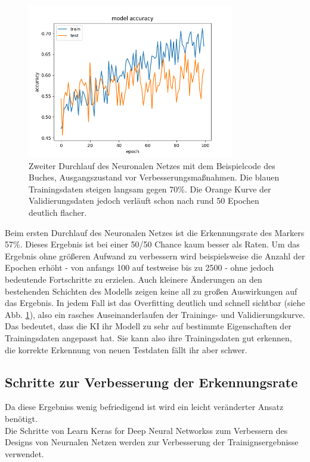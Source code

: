 \documentclass[conference]{IEEEtran}
\begin{document}
\begin{figure}[!h]
	\centering
	\includegraphics[width=9cm]{img/160x120:100@32_accuracy.png}
	\caption{Zweiter Durchlauf des Neuronalen Netzes mit dem Beispielcode
		des Buches, Ausgangszustand vor Verbesserungsmaßnahmen. Die 
		blauen Trainingsdaten steigen langsam gegen 
		70\%. Die Orange Kurve der Validierungsdaten jedoch verläuft schon 
		nach rund 50 Epochen deutlich flacher. }
	\label{Initiales Ergebnis}
\end{figure}
Beim ersten Durchlauf des Neuronalen Netzes ist die Erkennungsrate des 
Markers 57\%. Dieses Ergebnis ist bei einer 50/50 Chance kaum besser als 
Raten. 
Um das Ergebnis ohne größeren Aufwand zu verbessern wird beispielsweise die Anzahl der Epochen erhöht - von anfangs 100 auf testweise bis zu 2500 - ohne jedoch bedeutende Fortschritte zu erzielen.
Auch kleinere Änderungen an den bestehenden Schichten des Modells zeigen keine all zu großen Auswirkungen auf das Ergebnis.
In jedem Fall ist das Overfitting deutlich und schnell sichtbar (siehe Abb. \ref{Initiales Ergebnis}), also ein rasches Auseinanderlaufen der Trainings- und Validierungskurve.
Das bedeutet, dass die KI ihr Modell zu sehr auf bestimmte Eigenschaften der Trainingsdaten angepasst hat.
Sie kann also ihre Trainingsdaten gut erkennen, die korrekte Erkennung von neuen Testdaten fällt ihr aber schwer.

	\subsection{Schritte zur Verbesserung der Erkennungsrate} %
Da diese Ergebniss wenig befriedigend ist wird ein leicht veränderter Ansatz 
benötigt. \\
	Die Schritte von \glqq Learn Keras for Deep Neural Networkss\grqq \cite{moolayil2019learn} zum Verbessern des Designs von Neurnalen Netzen werden zur Verbesserung der Trainignsergebnisse verwendet. 
	
\end{document}

